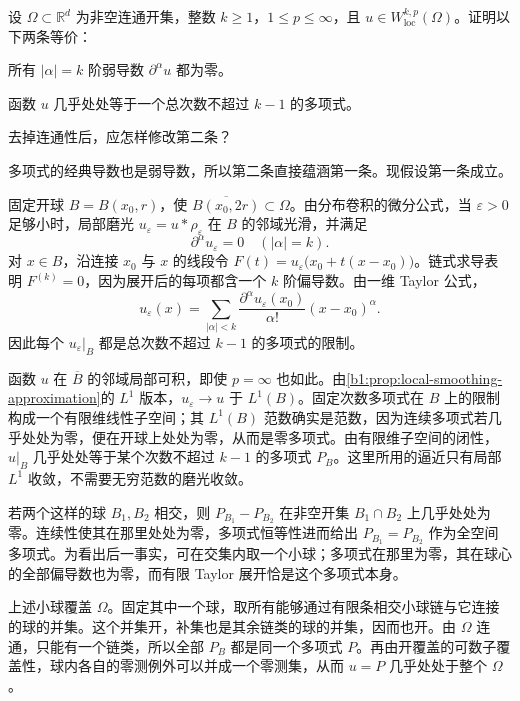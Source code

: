 \begin{optionalexercise}\label{b1:ex:21-highest-derivative-kernel}
设 \(\Omega\subset\mathbb R^d\) 为非空连通开集，整数 \(k\ge1\)，\(1\le p\le\infty\)，且 \(u\in W^{k,p}_{\mathrm{loc}}(\Omega)\)。证明以下两条等价：
\begin{equivalences}
\item\label{b1:item:21-highest-derivatives-zero}
所有 \(|\alpha|=k\) 阶弱导数 \(\partial^\alpha u\) 都为零。
\item\label{b1:item:21-polynomial-representative}
函数 \(u\) 几乎处处等于一个总次数不超过 \(k-1\) 的多项式。
\end{equivalences}
去掉连通性后，应怎样修改第二条？
\end{optionalexercise}
\begin{solution}
多项式的经典导数也是弱导数，所以第二条直接蕴涵第一条。现假设第一条成立。

固定开球 \(B=B(x_0,r)\)，使 \(\overline{B(x_0,2r)}\subset\Omega\)。由分布卷积的微分公式，当 \(\varepsilon>0\) 足够小时，局部磨光 \(u_\varepsilon=u*\rho_\varepsilon\) 在 \(B\) 的邻域光滑，并满足
\[
 \partial^\alpha u_\varepsilon=0\quad(|\alpha|=k).
\]
对 \(x\in B\)，沿连接 \(x_0\) 与 \(x\) 的线段令 \(F(t)=u_\varepsilon\bigl(x_0+t(x-x_0)\bigr)\)。链式求导表明 \(F^{(k)}=0\)，因为展开后的每项都含一个 \(k\) 阶偏导数。由一维 Taylor 公式，
\[
 u_\varepsilon(x)
 =\sum_{|\alpha|<k}
     \frac{\partial^\alpha u_\varepsilon(x_0)}{\alpha!}(x-x_0)^\alpha.
\]
因此每个 \(u_\varepsilon|_B\) 都是总次数不超过 \(k-1\) 的多项式的限制。

函数 \(u\) 在 \(\overline B\) 的邻域局部可积，即使 \(p=\infty\) 也如此。由\cref{b1:prop:local-smoothing-approximation}的 \(L^1\) 版本，\(u_\varepsilon\to u\) 于 \(L^1(B)\)。固定次数多项式在 \(B\) 上的限制构成一个有限维线性子空间；其 \(L^1(B)\) 范数确实是范数，因为连续多项式若几乎处处为零，便在开球上处处为零，从而是零多项式。由有限维子空间的闭性，\(u|_B\) 几乎处处等于某个次数不超过 \(k-1\) 的多项式 \(P_B\)。这里所用的逼近只有局部 \(L^1\) 收敛，不需要无穷范数的磨光收敛。

若两个这样的球 \(B_1,B_2\) 相交，则 \(P_{B_1}-P_{B_2}\) 在非空开集 \(B_1\cap B_2\) 上几乎处处为零。连续性使其在那里处处为零，多项式恒等性进而给出 \(P_{B_1}=P_{B_2}\) 作为全空间多项式。为看出后一事实，可在交集内取一个小球；多项式在那里为零，其在球心的全部偏导数也为零，而有限 Taylor 展开恰是这个多项式本身。

上述小球覆盖 \(\Omega\)。固定其中一个球，取所有能够通过有限条相交小球链与它连接的球的并集。这个并集开，补集也是其余链类的球的并集，因而也开。由 \(\Omega\) 连通，只能有一个链类，所以全部 \(P_B\) 都是同一个多项式 \(P\)。再由开覆盖的可数子覆盖性，球内各自的零测例外可以并成一个零测集，从而 \(u=P\) 几乎处处于整个 \(\Omega\)。


\end{solution}
